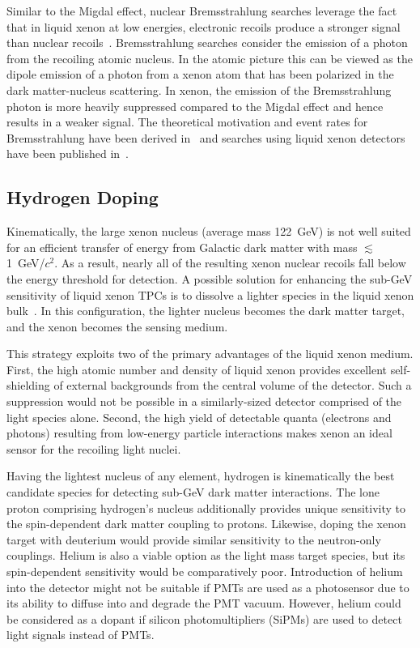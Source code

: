 Similar to the Migdal effect, nuclear Bremsstrahlung searches leverage the fact that in liquid xenon at low energies, electronic recoils produce a stronger signal than nuclear recoils~\cite{Kouvaris:2016afs}. Bremsstrahlung searches consider the emission of a photon from the recoiling atomic nucleus. In the atomic picture this can be viewed as the dipole emission of a photon from a xenon atom that has been polarized in the dark matter-nucleus scattering. In xenon, the emission of the Bremsstrahlung photon is more heavily suppressed compared to the Migdal effect and hence results in a weaker signal. The theoretical motivation and event rates for Bremsstrahlung have been derived in~\cite{Kouvaris:2016afs} and searches using liquid xenon detectors have been published in~\cite{Akerib:2018hck,Kobayashi:2018jky,McCabe:2017rln}.

\subsection{Hydrogen Doping}\label{sec:hydrodoping}

Kinematically, the large xenon nucleus (average mass 122~GeV) is not well suited for an efficient transfer of energy from Galactic dark matter with mass $\lesssim$1~GeV/$c^2$. As a result, nearly all of the resulting xenon nuclear recoils fall below the energy threshold for detection. A possible solution for enhancing the sub-GeV sensitivity of liquid xenon TPCs is to dissolve a lighter species in the liquid xenon bulk~\cite{Akerib:2021hydrox}. In this configuration, the lighter nucleus becomes the dark matter target, and the xenon becomes the sensing medium.

This strategy exploits two of the primary advantages of the liquid xenon medium. First, the high atomic number and density of liquid xenon provides excellent self-shielding of external backgrounds from the central volume of the detector. Such a suppression would not be possible in a similarly-sized detector comprised of the light species alone. Second, the high yield of detectable quanta (electrons and photons) resulting from low-energy particle interactions makes xenon an ideal sensor for the recoiling light nuclei.

Having the lightest nucleus of any element, hydrogen is kinematically the best candidate species for detecting sub-GeV dark matter interactions. The lone proton comprising hydrogen's nucleus additionally provides unique sensitivity to the spin-dependent dark matter coupling to protons. Likewise, doping the xenon target with deuterium would provide similar sensitivity to the neutron-only couplings. Helium is also a viable option as the light mass target species, but its spin-dependent sensitivity would be comparatively poor. Introduction of helium into the detector might not be suitable if PMTs are used as a photosensor due to its ability to diffuse into and degrade the PMT vacuum. However, helium could be considered as a dopant if silicon photomultipliers (SiPMs) are used to detect light signals instead of PMTs.


